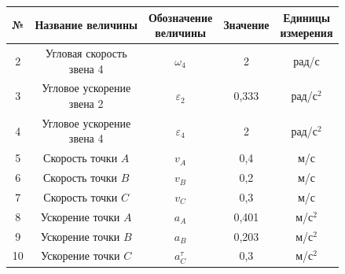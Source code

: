 \documentclass{article}
\begin{document}
\begin{tabular}{|c|c|c|c|c|}
     \hline
     \rule{0pt}{1cm} № & \hspace*{0.5cm} Название величины \hspace*{0.5cm} & \makecell{Обозначение\\ величины} & Значение & \makecell{Единицы\\ измерения} \\[0.5cm]
     \hline
     \rule{0pt}{1cm} 2  & \makecell{Угловая скорость\\звена 4} & $\omega_4$ & 2 & рад/с \\[0.5cm]
     \hline
      \rule{0pt}{1cm} 3  & \makecell{Угловое ускорение\\звена 2} & $\varepsilon_2$ & 0,333 & рад/с$^2$ \\[0.5cm]
     \hline
     \rule{0pt}{1cm} 4  & \makecell{Угловое ускорение\\звена 4} & $\varepsilon_4$ & 2 & рад/с$^2$ \\[0.5cm]
      \hline
      \rule{0pt}{1cm} 5  & \makecell{Скорость\\точки $A$} & $v_A$ & 0,4 & м/с \\[0.5cm]
      \hline
      \rule{0pt}{1cm} 6  & \makecell{Скорость\\точки $B$} & $v_B$ & 0,2 & м/с \\[0.5cm]
      \hline
      \rule{0pt}{1cm} 7  & \makecell{Скорость\\точки $C$} & $v_C$ & 0,3 & м/с \\[0.5cm]
      \hline
      \rule{0pt}{1cm} 8  & \makecell{Ускорение\\точки $A$} & $a_A$ & 0,401 & м/с$^2$ \\[0.5cm]
      \hline
      \rule{0pt}{1cm} 9 & \makecell{Ускорение\\точки $B$} & $a_B$ & 0,203 & м/с$^2$ \\[0.5cm]
      \hline
      \rule{0pt}{1cm} 10 & \makecell{Ускорение\\точки $C$} & $a_C^\tau$ & 0,3 & м/с$^2$ \\[0.5cm]
      \hline
\end{tabular}
\end{document}
